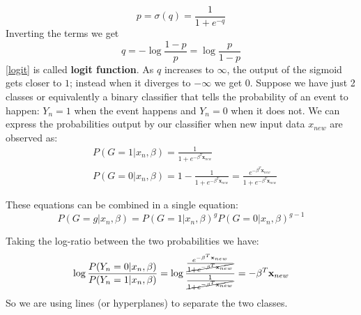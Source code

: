 \documentclass[12pt, letterpaper]{article}
\theoremstyle{definition}
\newcommand{\x}{\mathbf{x}}
\begin{document}
\begin{equation}
p=\sigma(q) = \frac{1}{1+e^{-q}}
\end{equation}
Inverting the terms we get 
\begin{equation}
\label{logit}
q = -\log\frac{1-p}{p} = \log \frac{p}{1-p} 
\end{equation}
\ref{logit} is called \textbf{logit function}. As $q$ increases to $\infty$, the output of the sigmoid gets closer to $1$; instead when it diverges to $-\infty$ we get $0$. Suppose we have just 2 classes or equivalently a binary classifier that tells the probability of an event to happen: $Y_n=1$ when the event happens and $Y_n=0$ when it does not. We can express the probabilities output by our classifier when new input data $x_{new}$ are observed as:
\begin{equation}
\begin{aligned}
&P(G=1|x_n, \beta) =  \frac{1}{1+e^{-\beta^T\x_{new}}}\\
&P(G=0|x_n, \beta) = 1- \frac{1}{1+e^{-\beta^T\x_{new}}} = \frac{e^{-\beta^T\x_{new}}}{1+e^{-\beta^T\x_{new}}}
\end{aligned}
\end{equation}

These equations can be combined in a single equation:
\begin{equation}
P(G=g|x_n, \beta) =  P(G=1|x_n, \beta)^{g} P(G=0|x_n, \beta)^{g-1}
\end{equation}

Taking the log-ratio between the two probabilities we have:
\begin{equation}
\begin{aligned}
\log \frac{P(Y_n=0|x_n, \beta)}{P(Y_n=1|x_n, \beta)} =  \log \frac{\frac{e^{-\beta^T\x_{new}}}{\cancel{1+e^{-\beta^T\x_{new}}}}}{\frac{1}{\cancel{1+e^{-\beta^T\x_{new}}}}} = -\beta^T\x_{new}
\end{aligned}
\end{equation}
So we are using lines (or hyperplanes) to separate the two classes.
\end{document}
